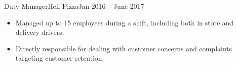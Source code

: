 \begin{cvsubsection}{Duty Manager}{Hell Pizza}{Jan 2016 -- June 2017}
    \begin{itemize}
        \item Managed up to 15 employees during a shift, including both in store and delivery drivers.
        \item Directly responsible for dealing with customer concerns and complaints targeting customer retention.
    \end{itemize}
\end{cvsubsection}